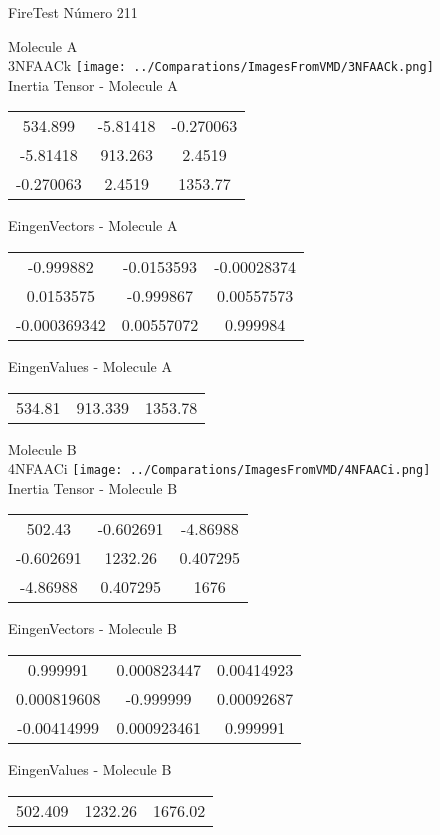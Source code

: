 \vtab[-2cm]
\begin{center}
{\large FireTest \tab Número 211}
\end{center}
\begin{multicols}{2}
\begin{center}

Molecule A \\ 
3NFAACk
\texttt{[image: ../Comparations/ImagesFromVMD/3NFAACk.png]}
\\
Inertia Tensor - Molecule A \\
\vtab

\begin{tabular}{|c c c|}
534.899	 & 	-5.81418	 & 	-0.270063	 \\
-5.81418	 & 	913.263	 & 	2.4519	 \\
-0.270063	 & 	2.4519	 & 	1353.77
\end{tabular}

\vtab
 EingenVectors - Molecule A     \\
\vtab
\begin{tabular}{|c c c|}
-0.999882	 & 	-0.0153593	 & 	-0.00028374	 \\
0.0153575	 & 	-0.999867	 & 	0.00557573	 \\
-0.000369342	 & 	0.00557072	 & 	0.999984
\end{tabular}

\vtab
 EingenValues - Molecule A     \\
\vtab
\begin{tabular}{|c c c|}
534.81	 & 	913.339	 & 	1353.78	 \\
\end{tabular}
\columnbreak

Molecule B \\ 
4NFAACi
\texttt{[image: ../Comparations/ImagesFromVMD/4NFAACi.png]}
\\
Inertia Tensor - Molecule B \\
\vtab

\begin{tabular}{|c c c|}
502.43	 & 	-0.602691	 & 	-4.86988	 \\
-0.602691	 & 	1232.26	 & 	0.407295	 \\
-4.86988	 & 	0.407295	 & 	1676
\end{tabular}

\vtab
 EingenVectors - Molecule B     \\
\vtab
\begin{tabular}{|c c c|}
0.999991	 & 	0.000823447	 & 	0.00414923	 \\
0.000819608	 & 	-0.999999	 & 	0.00092687	 \\
-0.00414999	 & 	0.000923461	 & 	0.999991
\end{tabular}

\vtab
 EingenValues - Molecule B     \\
\vtab
\begin{tabular}{|c c c|}
502.409	 & 	1232.26	 & 	1676.02	 \\
\end{tabular}

\end{center}
\end{multicols}
